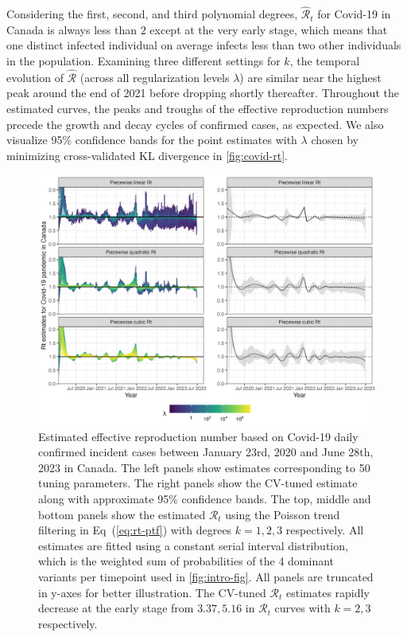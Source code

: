 \documentclass[10pt,letterpaper]{article}
\def\calR{\mathcal{R}}
\renewcommand{\eqref}[1]{Eq~(\ref{#1})}
\begin{document}
Considering the first, second, and third polynomial degrees, $\widehat{\calR}_t$
for Covid-19 in Canada is
always less than $2$ except at the very early stage, which means that one
distinct infected individual on average infects less than two other
individuals in the population. Examining three different settings for $k$, the
temporal evolution of $\widehat{\calR}$ (across all regularization levels
$\lambda$) are similar near the highest peak around the end of 2021 before
dropping shortly thereafter. Throughout the estimated curves, the peaks and
troughs of the effective reproduction numbers precede the growth and decay cycles of
confirmed cases, as expected. We also visualize 95\% confidence bands for the
point estimates with $\lambda$ chosen by minimizing cross-validated KL
divergence in \autoref{fig:covid-rt}.     

\begin{figure}[!ht]
  \centering
  \includegraphics[width=0.99\linewidth]{fig/covid_full_res.png}
  \caption{Estimated effective reproduction number based on Covid-19 daily
  confirmed incident cases between January 23rd, 2020 and June 28th, 2023 in
  Canada. The left panels show estimates corresponding to 50
  tuning parameters. The right panels show the CV-tuned estimate along with
  approximate 95\% confidence bands. The top, middle and bottom panels show the
  estimated $\calR_t$ using the Poisson trend filtering in \eqref{eq:rt-ptf}
  with degrees $k=1,2,3$ respectively. All estimates are fitted using a constant
  serial interval distribution, which is the weighted sum of probabilities of 
  the 4 dominant variants per timepoint used in \autoref{fig:intro-fig}. 
  All panels are truncated in y-axes for better illustration. The CV-tuned 
  $\calR_t$ estimates rapidly decrease at the early stage from $3.37,5.16$ 
  in $\calR_t$ curves with $k=2,3$ respectively.} 
  \label{fig:covid-rt}
\end{figure} 
\end{document}
